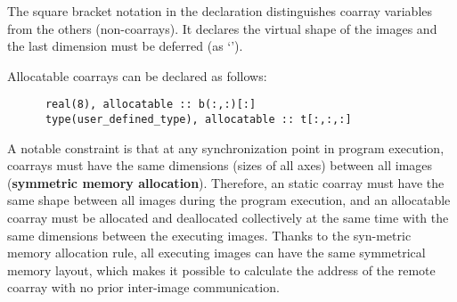 The square bracket notation in the declaration distinguishes coarray variables from 
the others (non-coarrays). It declares the virtual shape of the images and the last 
dimension must be deferred (as `{\tt *}').

Allocatable coarrays can be declared as follows:
\begin{verbatim}
      real(8), allocatable :: b(:,:)[:]
      type(user_defined_type), allocatable :: t[:,:,:]
\end{verbatim}


A notable constraint is that at any synchronization point in program execution, 
coarrays must have the same dimensions (sizes of all axes) between all images
({\bf symmetric memory allocation}). 
Therefore, an static coarray must have the same shape between all images during 
the program execution, and an allocatable coarray must be allocated and deallocated 
collectively at the same time with the same dimensions between the executing images.
Thanks to the syn-metric memory allocation rule, all executing images can have
the same symmetrical memory layout, which makes it possible to calculate the address 
of the remote coarray with no prior inter-image communication.


